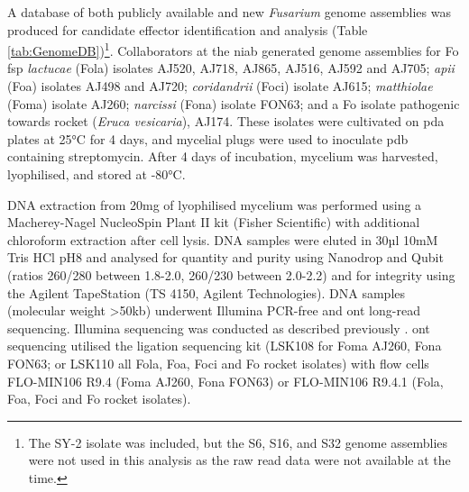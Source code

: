 A database of both publicly available and new \textit{Fusarium} genome assemblies was produced for candidate effector identification and analysis (Table \ref{tab:GenomeDB})\footnote{The SY-2 isolate was included, but the S6, S16, and S32 genome assemblies were not used in this analysis as the raw read data were not available at the time.}. Collaborators at the \ac{niab} generated genome assemblies for \ac{Fo} \ac{fsp} \textit{lactucae} (\acs{Fola}) isolates AJ520, AJ718, AJ865, AJ516, AJ592 and AJ705; \textit{apii} (\acs{Foa}) isolates AJ498 and AJ720; \textit{coridandrii} (\acs{Foci}) isolate AJ615; \textit{matthiolae} (\acs{Foma}) isolate AJ260; \textit{narcissi} (\acs{Fona}) isolate FON63; and a \ac{Fo} isolate pathogenic towards rocket (\textit{Eruca vesicaria}), AJ174. These isolates were cultivated on \ac{pda} plates at 25°C for 4 days, and mycelial plugs were used to inoculate \ac{pdb} containing streptomycin. After 4 days of incubation, mycelium was harvested, lyophilised, and stored at -80°C. 

DNA extraction from 20mg of lyophilised mycelium was performed using a Macher\-ey-Nagel NucleoSpin Plant II kit (Fisher Scientific) with additional chloroform extraction after cell lysis. DNA samples were eluted in 30µl 10mM Tris HCl pH8 and analysed for quantity and purity using Nanodrop and Qubit (ratios 260/280 between 1.8-2.0, 260/230 between 2.0-2.2)  and for integrity using the Agilent TapeStation (TS 4150, Agilent Technologies). DNA samples (molecular weight >50kb) underwent Illumina PCR-free and \ac{ont} long-read sequencing. Illumina sequencing was conducted as described previously \parencite{Armitage2018}. \ac{ont} sequencing utilised the ligation sequencing kit (LSK108 for \ac{Foma} AJ260, \ac{Fona} FON63; or LSK110 all \ac{Fola}, \ac{Foa}, \ac{Foci} and \ac{Fo} rocket isolates) with flow cells FLO-MIN106 R9.4 (\ac{Foma} AJ260, \ac{Fona} FON63) or FLO-MIN106 R9.4.1 (\ac{Fola}, \ac{Foa}, \ac{Foci} and \ac{Fo} rocket isolates). 

